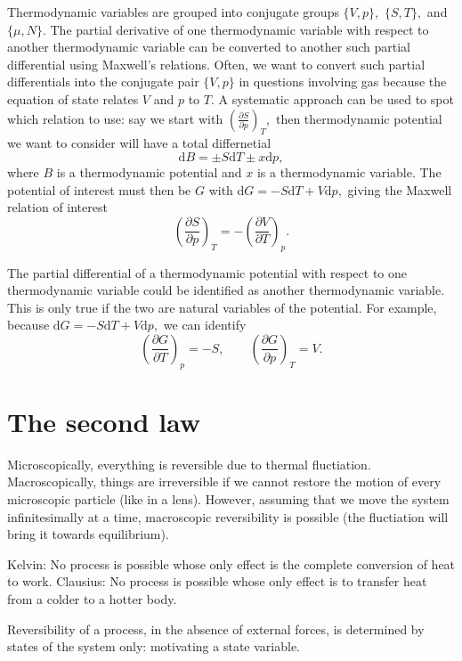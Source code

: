 \documentclass{article}
\theoremstyle{nonumberplain}
\begin{document}
Thermodynamic variables are grouped into conjugate groups $\{V,p\},$ $\{S,T\},$ and $\{\mu ,N\}.$ The partial derivative of one thermodynamic variable with respect to another thermodynamic variable can be converted to another such partial differential using Maxwell's relations. Often, we want to convert such partial differentials into the conjugate pair $\{V,p\}$ in questions involving gas because the equation of state relates $V$ and $p$ to $T.$ A systematic approach can be used to spot which relation to use: say we start with 
\(
    \left( \frac{\partial S}{\partial p} \right)_{T}, 
\)
then thermodynamic potential we want to consider will have a total differnetial
\[
    \mathrm{d} B = \pm S \mathrm{d} T \pm x \mathrm{d} p, 
\]
where $B$ is a thermodynamic potential and $x$ is a thermodynamic variable. The potential of interest must then be $G$ with $\mathrm{d} G = -S\mathrm{d} T + V \mathrm{d} p,$ giving the Maxwell relation of interest
\[
    \left( \frac{\partial S}{\partial p} \right)_{T} = 
    -\left( \frac{\partial V}{\partial T} \right)_{p}. 
\]

The partial differential of a thermodynamic potential with respect to one thermodynamic variable could be identified as another thermodynamic variable. This is only true if the two are natural variables of the potential. For example, because \(\mathrm{d} G = -S\mathrm{d} T + V \mathrm{d} p,\) we can identify
\[
    \left( \frac{\partial G}{\partial T} \right)_{p} = -S, 
    \qquad
    \left( \frac{\partial G}{\partial p} \right)_{T} = V.
\]

\section{The second law}
Microscopically, everything is reversible due to thermal fluctiation. Macroscopically, things are irreversible if we cannot restore the motion of every microscopic particle (like in a lens). However, assuming that we move the system infinitesimally at a time, macroscopic reversibility is possible (the fluctiation will bring it towards equilibrium). 

Kelvin: No process is possible whose only effect is the complete conversion of heat to work. 
Clausius: No process is possible whose only effect is to transfer heat from a colder to a hotter body. 

Reversibility of a process, in the absence of external forces, is determined by states of the system only: motivating a state variable. 
\end{document}
